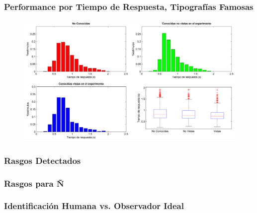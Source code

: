 \documentclass[10pt]{beamer}
\begin{document}
   	\begin{frame}
	\frametitle{Performance por Tiempo de Respuesta, Tipografías Famosas}
	    \begin{figure}
		\includegraphics[width=\textwidth]{graficos/tiempoRespuesta_PorFamosas.png}
	    \end{figure}
	\end{frame}

 	\begin{frame}
	\frametitle{Rasgos Detectados}

	\end{frame}

 	\begin{frame}
	\frametitle{Rasgos para \~N}

	\end{frame}

 	\begin{frame}
	\frametitle{Identificaci\'on Humana vs. Observador Ideal}

	\end{frame}
\end{document}

